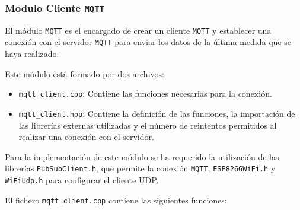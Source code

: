 \subsubsection{Modulo Cliente \texttt{MQTT}}

El módulo \texttt{MQTT} es el encargado de crear un cliente \texttt{MQTT} y establecer una conexión con el servidor \texttt{MQTT} para enviar los datos de la última medida que se haya realizado. 

Este módulo está formado por dos archivos:
\begin{itemize}
    \item \texttt{mqtt\_client.cpp}: Contiene las funciones necesarias para la conexión.
    \item \texttt{mqtt\_client.hpp}: Contiene la definición de las funciones, la importación de las librerías externas utilizadas y el número de reintentos permitidos al realizar una conexión con el servidor.
\end{itemize}

Para la implementación de este módulo se ha requerido la utilización de las librerías \texttt{PubSubClient.h}, que permite la conexión \texttt{MQTT}, \texttt{ESP8266WiFi.h} y \texttt{WiFiUdp.h} para configurar el cliente UDP. \cite{olearyKnollearyPubsubclient2024}

El fichero \texttt{mqtt\_client.cpp} contiene las siguientes funciones:

